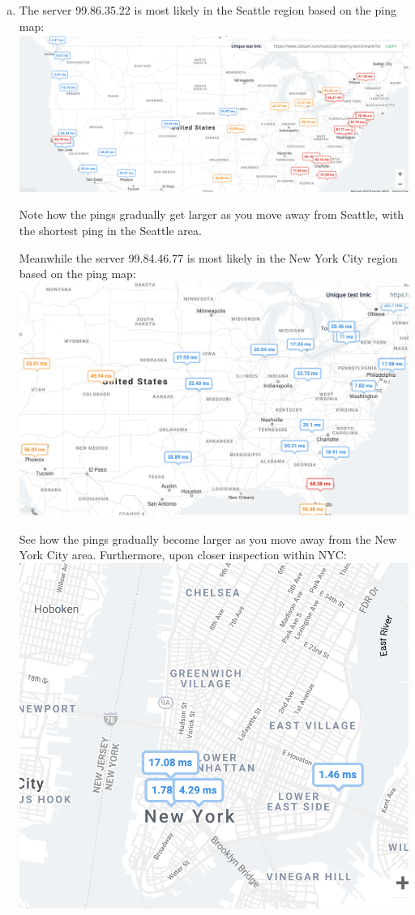 \documentclass[11pt]{article}
\begin{document}
\begin{enumerate}[(a)]
    \item
      The server 99.86.35.22 is most likely in the Seattle region based on the ping
      map: \\
      \includegraphics[width=15cm]{11}

      Note how the pings gradually get larger as you move away from Seattle, with
      the shortest ping in the Seattle area.

      Meanwhile the server 99.84.46.77 is most likely in the New York City region
      based on the ping map: \\
      \includegraphics[width=15cm]{12}

      See how the pings gradually become larger as you move away from the New York
      City area. Furthermore, upon closer inspection within NYC: \\
      \includegraphics[width=15cm]{13}


\end{enumerate}
\end{document}

